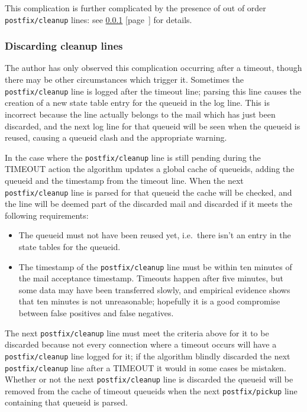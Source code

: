 \documentclass[a4paper,12pt,draft]{article}
\newcommand{\refwithpage}[1]{%
    \empty{}\ref{#1} [page~\pageref{#1}]%
}
\newcommand{\sectionref}[1]{%
    \textsection{}\refwithpage{#1}%
}
\newcommand{\daemon}[1]{%
    \texttt{postfix/#1}%
}
\begin{document}
This complication is further complicated by the presence of out of order
\daemon{cleanup} lines: see \sectionref{discarding cleanup lines} for
details.

\subsubsection{Discarding cleanup lines}

\label{discarding cleanup lines}

The author has only observed this complication occurring after a timeout,
though there may be other circumstances which trigger it.  Sometimes the
\daemon{cleanup} line is logged after the timeout line; parsing this line
causes the creation of a new state table entry for the queueid in the log
line.  This is incorrect because the line actually belongs to the mail
which has just been discarded, and the next log line for that queueid will
be seen when the queueid is reused, causing a queueid clash and the
appropriate warning.

In the case where the \daemon{cleanup} line is still pending during the
TIMEOUT action the algorithm updates a global cache of queueids, adding the
queueid and the timestamp from the timeout line.  When the next
\daemon{cleanup} line is parsed for that queueid the cache will be checked,
and the line will be deemed part of the discarded mail and discarded if it
meets the following requirements:

\begin{itemize}

    \item The queueid must not have been reused yet, i.e.\ there isn't an
        entry in the state tables for the queueid.

    \item The timestamp of the \daemon{cleanup} line must be within ten
        minutes of the mail acceptance timestamp.  Timeouts happen after
        five minutes, but some data may have been transferred slowly, and
        empirical evidence shows that ten minutes is not unreasonable;
        hopefully it is a good compromise between false positives and false
        negatives.

\end{itemize}

The next \daemon{cleanup} line must meet the criteria above for it to be
discarded because not every connection where a timeout occurs will have a
\daemon{cleanup} line logged for it; if the algorithm blindly discarded the
next \daemon{cleanup} line after a TIMEOUT it would in some cases be
mistaken.  Whether or not the next \daemon{cleanup} line is discarded the
queueid will be removed from the cache of timeout queueids when the next
\daemon{pickup} line containing that queueid is parsed.
\end{document}
